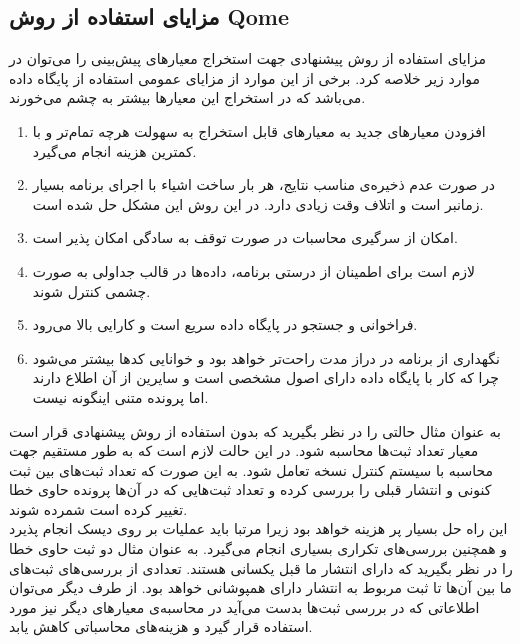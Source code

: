 \subsection{مزایای استفاده از روش Qome}
مزایای استفاده از روش پیشنهادی جهت استخراج معیارهای پیش‌بینی را می‌توان در موارد زیر خلاصه کرد. برخی از این موارد از مزایای عمومی استفاده از پایگاه داده می‌باشد که در استخراج این معیارها بیشتر به چشم می‌خورند.
\begin{enumerate}
\item افزودن معیارهای جدید به معیارهای قابل استخراج به سهولت هرچه تمام‌تر و با کمترین هزینه انجام می‌گیرد.

\item	

در صورت عدم ذخیره‌ی مناسب نتایج، هر بار ساخت اشیاء با اجرای برنامه بسیار زمانبر است و اتلاف وقت زیادی دارد. در این روش این مشکل حل شده است.
\item 
امکان از سرگیری محاسبات در صورت توقف به سادگی امکان پذیر است.

\item
لازم است برای اطمینان از درستی برنامه، داده‌ها در قالب جداولی به صورت چشمی کنترل شوند.
\item
فراخوانی و جستجو در پایگاه داده سریع است و کارایی بالا می‌رود.
\item
نگهداری از برنامه در دراز مدت راحت‌تر خواهد بود و خوانایی کدها بیشتر می‌شود چرا که کار با پایگاه داده دارای اصول مشخصی است و سایرین از آن اطلاع دارند اما پرونده متنی اینگونه نیست.
\end{enumerate}

به عنوان مثال حالتی را در نظر بگیرید که  بدون استفاده از روش پیشنهادی  قرار است معیار تعداد ثبت‌ها محاسبه شود. در این حالت لازم است که به طور مستقیم جهت محاسبه با سیستم کنترل نسخه تعامل شود.  به این صورت که تعداد ثبت‌های بین ثبت کنونی و انتشار قبلی  را بررسی کرده و تعداد  ثبت‌هایی که در آن‌ها پرونده حاوی خطا تغییر کرده است شمرده شوند.\\این راه حل بسیار پر هزینه  خواهد بود زیرا مرتبا باید عملیات  بر روی دیسک انجام پذیرد و همچنین بررسی‌های تکراری بسیاری انجام می‌گیرد. به عنوان مثال دو ثبت حاوی خطا را در نظر بگیرید که دارای انتشار ما قبل یکسانی هستند. تعدادی از بررسی‌های ثبت‌های ما بین آن‌ها تا ثبت مربوط به انتشار دارای همپوشانی خواهد بود. از طرف دیگر می‌توان اطلاعاتی که در بررسی ثبت‌ها بدست می‌آید در محاسبه‌ی معیارهای دیگر نیز مورد استفاده قرار گیرد و هزینه‌های محاسباتی کاهش یابد. 

